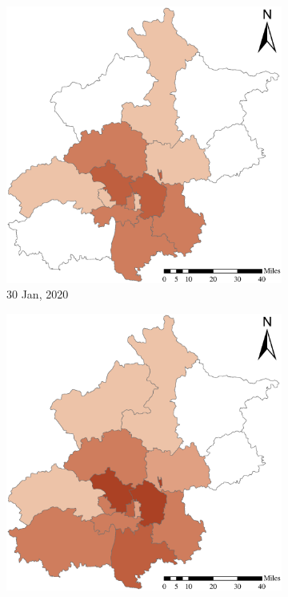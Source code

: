 \documentclass[preprints,ijgi,submit,moreauthors]{Definitions/mdpi}
\begin{document}
\begin{figure}[H]
\begin{subfigure}{.23\textwidth}
        \includegraphics[width=\textwidth]{Figures/ConfirmedDistrictD2020_01_30.eps}
        \caption{30 Jan, 2020}
    \end{subfigure}
    \begin{subfigure}{.23\textwidth}
        \includegraphics[width=\textwidth]{Figures/ConfirmedDistrictD2020_02_05.eps}

\end{subfigure}
\end{figure}
\end{document}
